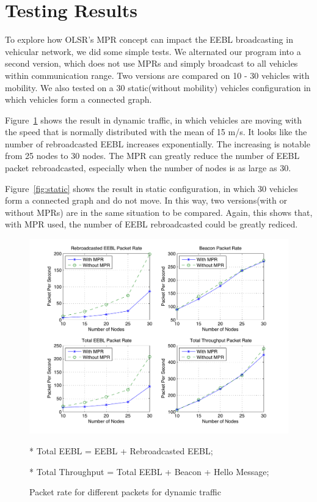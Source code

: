 \documentclass[twocolumn]{article}
\begin{document}
    \section{Testing Results}
    \par{To explore how OLSR's MPR concept can impact the EEBL broadcasting in vehicular network, we did some simple tests. We alternated our program into a second version, which does not use MPRs and simply broadcast to all vehicles within communication range. Two versions are compared on 10 - 30 vehicles with mobility. We also tested on a 30 static(without mobility) vehicles configuration in which vehicles form a connected graph.}
    \par{Figure~\ref{fig:dynamic} shows the result in dynamic traffic, in which vehicles are moving with the speed that is normally distributed with the mean of 15 m/s. It looks like the number of rebroadcasted EEBL increases exponentially. The increasing is notable from 25 nodes to 30 nodes. The MPR can greatly reduce the number of EEBL packet rebroadcasted, especially when the number of nodes is as large as 30.}
    \par{Figure~\ref{fig:static} shows the result in static configuration, in which 30 vehicles form a connected graph and do not move. In this way, two versions(with or without MPRs) are in the same situation to be compared. Again, this shows that, with MPR used, the number of EEBL rebroadcasted could be greatly rediced.}
    \begin{figure}[htb]
    \begin{center}
    \includegraphics[width=\columnwidth]{fig/dynamic.pdf}
    \end{center}
    \par{\footnotesize{* Total EEBL = EEBL + Rebroadcasted EEBL;}}
    \par{\footnotesize{* Total Throughput = Total EEBL + Beacon + Hello Message;}}
    \caption{Packet rate for different packets for dynamic traffic}
    \label{fig:dynamic}
    \end{figure}
\end{document}
